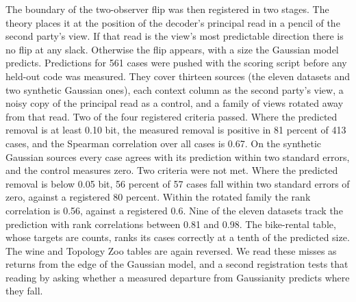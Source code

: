 \documentclass[11pt]{article}
\begin{document}
The boundary of the two-observer flip was then registered in two
stages. The theory places it at the position of the decoder's principal
read in a pencil of the second party's view. If that read is the view's
most predictable direction there is no flip at any slack. Otherwise the
flip appears, with a size the Gaussian model predicts. Predictions for
561 cases were pushed with the scoring script before any held-out code
was measured. They cover thirteen sources (the eleven datasets and two
synthetic Gaussian ones), each context column as the second party's
view, a noisy copy of the principal read as a control, and a family of
views rotated away from that read. Two of the four registered criteria
passed. Where the predicted removal is at least 0.10 bit, the measured
removal is positive in 81 percent of 413 cases, and the Spearman
correlation over all cases is 0.67. On the synthetic Gaussian sources
every case agrees with its prediction within two standard errors, and
the control measures zero. Two criteria were not met. Where the
predicted removal is below 0.05 bit, 56 percent of 57 cases fall within
two standard errors of zero, against a registered 80 percent. Within the
rotated family the rank correlation is 0.56, against a registered 0.6.
Nine of the eleven datasets track the prediction with rank correlations
between 0.81 and 0.98. The bike-rental table, whose targets are counts,
ranks its cases correctly at a tenth of the predicted size. The wine and
Topology Zoo tables are again reversed. We read these misses as returns
from the edge of the Gaussian model, and a second registration tests
that reading by asking whether a measured departure from Gaussianity
predicts where they fall.
\end{document}
